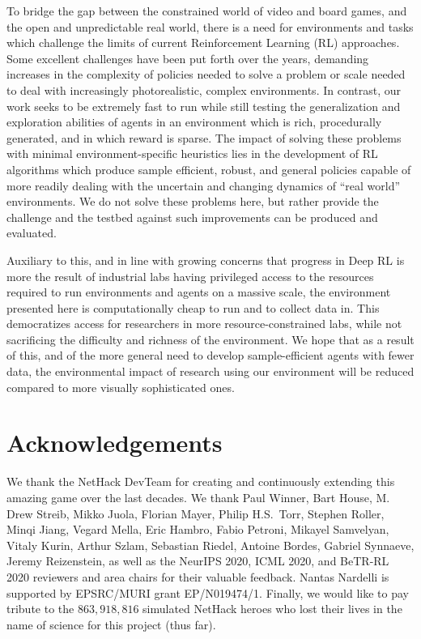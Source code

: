 \documentclass{article}
\begin{document}
To bridge the gap between the constrained world of video and board games, and the open and unpredictable real world, there is a need for environments and tasks which challenge the limits of current Reinforcement Learning (RL) approaches.
Some excellent challenges have been put forth over the years, demanding increases in the complexity of policies needed to solve a problem or scale needed to deal with increasingly photorealistic, complex environments.
In contrast, our work seeks to be extremely fast to run while still testing the generalization and exploration abilities of agents in an environment which is rich, procedurally generated, and in which reward is sparse. The impact of solving these problems with minimal environment-specific heuristics lies in the development of RL algorithms which produce sample efficient, robust, and general policies capable of more readily dealing with the uncertain and changing dynamics of ``real world'' environments. We do not solve these problems here, but rather provide the challenge and the testbed against such improvements can be produced and evaluated.

Auxiliary to this, and in line with growing concerns that progress in Deep RL is more the result of industrial labs having privileged access to the resources required to run environments and agents on a massive scale, the environment presented here is computationally cheap to run and to collect data in. This democratizes access for researchers in more resource-constrained labs, while not sacrificing the difficulty and richness of the environment. We hope that as a result of this, and of the more general need to develop sample-efficient agents with fewer data, the environmental impact of research using our environment will be reduced compared to more visually sophisticated ones.


\section*{Acknowledgements}
We thank the NetHack DevTeam for creating and continuously extending
this amazing game over the last decades. We thank Paul Winner, Bart
House, M. Drew Streib, Mikko Juola, Florian Mayer, Philip H.S.~Torr,
Stephen Roller, Minqi Jiang, Vegard Mella, Eric Hambro, Fabio Petroni,
Mikayel Samvelyan, Vitaly Kurin, Arthur Szlam, Sebastian
Riedel, Antoine Bordes, Gabriel Synnaeve, Jeremy Reizenstein, as well
as the NeurIPS 2020, ICML 2020, and BeTR-RL 2020 reviewers and area chairs for their
valuable feedback.
Nantas Nardelli is supported by EPSRC/MURI grant EP/N019474/1.
Finally, we would like to pay tribute to the $863{,}918{,}816$ simulated NetHack heroes who lost their lives in the name of science for this project (thus far).
\end{document}
